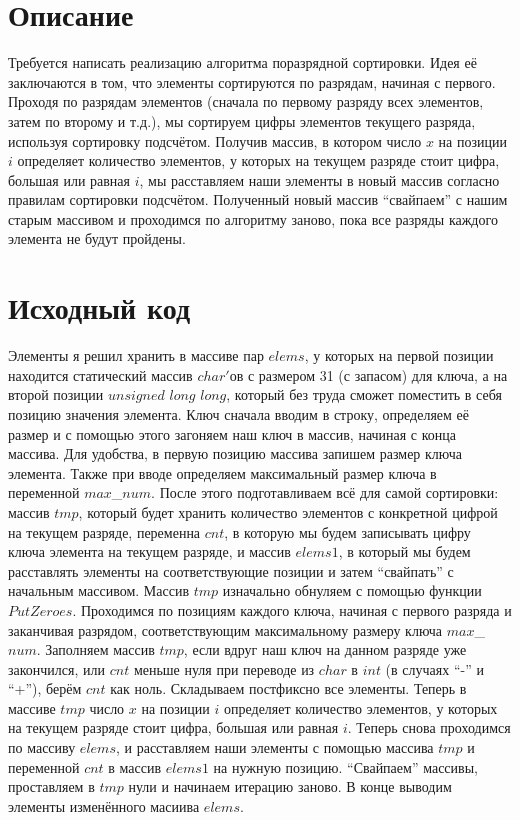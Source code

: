 \section{Описание}
Требуется написать реализацию алгоритма поразрядной сортировки. Идея её заключаются в том, что элементы сортируются по разрядам, начиная с первого. Проходя по разрядам элементов (сначала по первому разряду всех элементов, затем по второму и т.д.), мы сортируем цифры элементов текущего разряда, используя сортировку подсчётом. Получив массив, в котором число $x$ на позиции $i$ определяет количество элементов, у которых на текущем разряде стоит цифра, большая или равная $i$, мы расставляем наши элементы в новый массив согласно правилам сортировки подсчётом. Полученный новый массив \enquote{свайпаем} с нашим старым массивом и проходимся по алгоритму заново, пока все разряды каждого элемента не будут пройдены.

\pagebreak

\section{Исходный код}

Элементы я решил хранить в массиве пар $elems$, у которых на первой позиции находится статический массив $char'$ов с размером 31 (с запасом) для ключа, а на второй позиции $unsigned$ $long$ $long$, который без труда сможет поместить в себя  позицию значения элемента. Ключ сначала вводим в строку, определяем её размер и с помощью этого загоняем наш ключ в массив, начиная с конца массива. Для удобства, в первую позицию массива запишем размер ключа элемента. Также при вводе определяем максимальный размер ключа в переменной $max$\_$num$. После этого подготавливаем всё для самой сортировки: массив $tmp$, который будет хранить количество элементов с конкретной цифрой на текущем разряде, переменна $cnt$, в которую мы будем записывать цифру ключа элемента на текущем разряде, и массив $elems1$, в который мы будем расставлять элементы на соответствующие позиции и затем \enquote{свайпать} с начальным массивом. Массив $tmp$ изначально обнуляем с помощью функции $PutZeroes$.  Проходимся по позициям каждого ключа, начиная с первого разряда и заканчивая разрядом, соответствующим максимальному размеру ключа $max$\_$num$. Заполняем массив $tmp$, если вдруг наш ключ на данном разряде уже закончился, или $cnt$ меньше нуля при переводе из $char$ в $int$ (в случаях \enquote{-} и \enquote{+}), берём $cnt$ как ноль. Складываем постфиксно все элементы. Теперь в массиве $tmp$ число $x$ на позиции $i$ определяет количество элементов, у которых на текущем разряде стоит цифра, большая или равная $i$. Теперь снова проходимся по массиву $elems$, и расставляем наши элементы с помощью массива $tmp$ и переменной $cnt$ в массив $elems1$ на нужную позицию. \enquote{Свайпаем} массивы, проставляем в $tmp$ нули и начинаем итерацию заново. В конце выводим элементы изменённого масиива $elems$.

